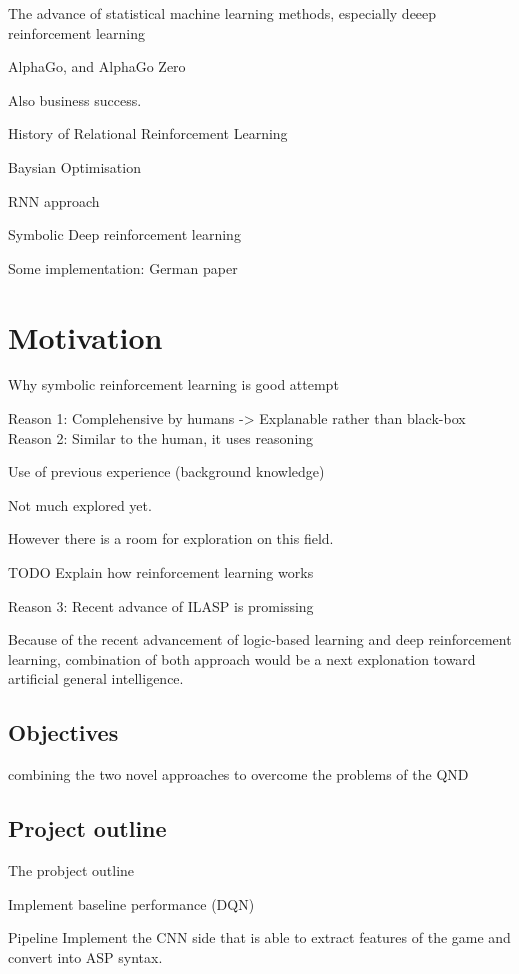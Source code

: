 \documentclass[12pt,twoside]{report}
\begin{document}
The advance of statistical machine learning methods, especially deeep reinforcement learning

AlphaGo, and AlphaGo Zero

Also business success.

History of Relational Reinforcement Learning

Baysian Optimisation

RNN approach

Symbolic Deep reinforcement learning

Some implementation: German paper

\chapter{Motivation}

Why symbolic reinforcement learning is good attempt


Reason 1: Complehensive by humans -> Explanable rather than black-box
Reason 2: Similar to the human, it uses reasoning

Use of previous experience (background knowledge)

Not much explored yet.

However there is a room for exploration on this field.

TODO Explain how reinforcement learning works

Reason 3: Recent advance of ILASP is promissing

Because of the recent advancement of logic-based learning and deep reinforcement learning, combination of both approach would be a next explonation toward artificial general intelligence.


\section{Objectives}

combining the two novel approaches to overcome the problems of the QND

\section{Project outline}

The probject outline

Implement baseline performance (DQN)


Pipeline
Implement the CNN side that is able to extract features of the game and convert into ASP syntax.
\end{document}
